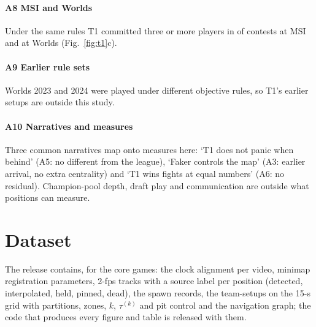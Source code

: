 
\paragraph*{A8 MSI and Worlds}
Under the same rules T1 committed three or more players in  of contests at MSI and  at Worlds (Fig.~\ref{fig:t1}c).

\paragraph*{A9 Earlier rule sets}
Worlds 2023 and 2024 were played under different objective rules, so T1's earlier setups are outside this study.

\paragraph*{A10 Narratives and measures}
Three common narratives map onto measures here: `T1 does not panic when behind' (A5: no different from the league), `Faker controls the map' (A3: earlier arrival, no extra centrality) and `T1 wins fights at equal numbers' (A6: no residual).
Champion-pool depth, draft play and communication are outside what positions can measure.

\section{Dataset}
\label{app:dataset}

The release contains, for the  core games: the clock alignment per video, minimap registration parameters, 2-fps tracks with a source label per position (detected, interpolated, held, pinned, dead), the  spawn records, the  team-setups on the 15-s grid with partitions, zones, $k$, $\tau^{(k)}$ and pit control and the navigation graph; the code that produces every figure and table is released with them.
